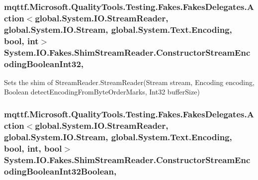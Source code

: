 \hypertarget{class_system_1_1_i_o_1_1_fakes_1_1_shim_stream_reader_ad88c2bd5927a2385da93f423e6e7a998}{
\subsubsection[{Constructor\-Stream\-Encoding\-Boolean\-Int32}]{\setlength{\rightskip}{0pt plus 5cm}mqttf.\-Microsoft.\-Quality\-Tools.\-Testing.\-Fakes.\-Fakes\-Delegates.\-Action$<$global.\-System.\-I\-O.\-Stream\-Reader, global.\-System.\-I\-O.\-Stream, global.\-System.\-Text.\-Encoding, bool, int$>$ System.\-I\-O.\-Fakes.\-Shim\-Stream\-Reader.\-Constructor\-Stream\-Encoding\-Boolean\-Int32\hspace{0.3cm}{\ttfamily [static]}, {\ttfamily [set]}}}\label{class_system_1_1_i_o_1_1_fakes_1_1_shim_stream_reader_ad88c2bd5927a2385da93f423e6e7a998}


Sets the shim of Stream\-Reader.\-Stream\-Reader(\-Stream stream, Encoding encoding, Boolean detect\-Encoding\-From\-Byte\-Order\-Marks, Int32 buffer\-Size)

\hypertarget{class_system_1_1_i_o_1_1_fakes_1_1_shim_stream_reader_aee56d8e3042fecfaaacde708af702fc9}{
\subsubsection[{Constructor\-Stream\-Encoding\-Boolean\-Int32\-Boolean}]{\setlength{\rightskip}{0pt plus 5cm}mqttf.\-Microsoft.\-Quality\-Tools.\-Testing.\-Fakes.\-Fakes\-Delegates.\-Action$<$global.\-System.\-I\-O.\-Stream\-Reader, global.\-System.\-I\-O.\-Stream, global.\-System.\-Text.\-Encoding, bool, int, bool$>$ System.\-I\-O.\-Fakes.\-Shim\-Stream\-Reader.\-Constructor\-Stream\-Encoding\-Boolean\-Int32\-Boolean\hspace{0.3cm}{\ttfamily [static]}, {\ttfamily [set]}}}\label{class_system_1_1_i_o_1_1_fakes_1_1_shim_stream_reader_aee56d8e3042fecfaaacde708af702fc9}


